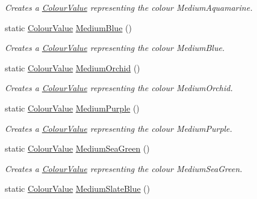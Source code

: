 \begin{DoxyCompactItemize}
\begin{DoxyCompactList}\small\item\em Creates a \hyperlink{classMezzanine_1_1ColourValue}{ColourValue} representing the colour MediumAquamarine. \item\end{DoxyCompactList}\item 
static \hyperlink{classMezzanine_1_1ColourValue}{ColourValue} \hyperlink{classMezzanine_1_1ColourValue_ae75feecfcbab7762fd9df7f89ad0409f}{MediumBlue} ()
\begin{DoxyCompactList}\small\item\em Creates a \hyperlink{classMezzanine_1_1ColourValue}{ColourValue} representing the colour MediumBlue. \item\end{DoxyCompactList}\item 
static \hyperlink{classMezzanine_1_1ColourValue}{ColourValue} \hyperlink{classMezzanine_1_1ColourValue_ac87aa1e29d99133e0011a90183535a9b}{MediumOrchid} ()
\begin{DoxyCompactList}\small\item\em Creates a \hyperlink{classMezzanine_1_1ColourValue}{ColourValue} representing the colour MediumOrchid. \item\end{DoxyCompactList}\item 
static \hyperlink{classMezzanine_1_1ColourValue}{ColourValue} \hyperlink{classMezzanine_1_1ColourValue_a9a05cc1da03e916cfe7d57e36bcbc8e7}{MediumPurple} ()
\begin{DoxyCompactList}\small\item\em Creates a \hyperlink{classMezzanine_1_1ColourValue}{ColourValue} representing the colour MediumPurple. \item\end{DoxyCompactList}\item 
static \hyperlink{classMezzanine_1_1ColourValue}{ColourValue} \hyperlink{classMezzanine_1_1ColourValue_a69deb08e29c1deaddb78c2e587ccba96}{MediumSeaGreen} ()
\begin{DoxyCompactList}\small\item\em Creates a \hyperlink{classMezzanine_1_1ColourValue}{ColourValue} representing the colour MediumSeaGreen. \item\end{DoxyCompactList}\item 
static \hyperlink{classMezzanine_1_1ColourValue}{ColourValue} \hyperlink{classMezzanine_1_1ColourValue_ac1b80be2f52b1fb962c212490f7b2e0c}{MediumSlateBlue} ()

\end{DoxyCompactItemize}
